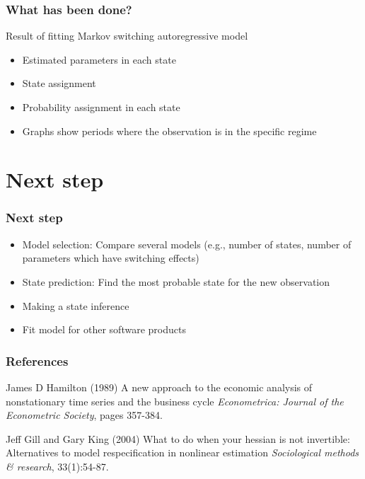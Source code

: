 \documentclass{beamer}
\begin{document}
\begin{frame}
\frametitle{What has been done?}
Result of fitting Markov switching autoregressive model
\begin{itemize}
	\item Estimated parameters in each state
	\item State assignment
	\item Probability assignment in each state
	\item Graphs show periods where the observation is in the specific regime
\end{itemize}

\end{frame}

\section{Next step}
\begin{frame}
\frametitle{Next step}
\begin{itemize}
	\item Model selection: Compare several models (e.g., number of states, number of parameters which have switching effects)
	\item State prediction: Find the most probable state for the new observation
	\item Making a state inference
	\item Fit model for other software products

\end{itemize}
\end{frame}

\begin{frame}
\frametitle{References}
\footnotesize{
	\begin{thebibliography}{99} %
		 James D Hamilton (1989)
		\newblock A new approach to the economic analysis of nonstationary time series and the business cycle
		\newblock \emph{Econometrica: Journal of the Econometric Society}, pages 357-384.
	\end{thebibliography}
	\begin{thebibliography}{99} %
		 Jeff Gill and Gary King (2004)
		\newblock What to do when your hessian is not invertible:
		Alternatives to model respecification in nonlinear estimation
		\newblock \emph{Sociological
			methods \& research}, 33(1):54-87.
	\end{thebibliography}
}
\end{frame}
\end{document}
